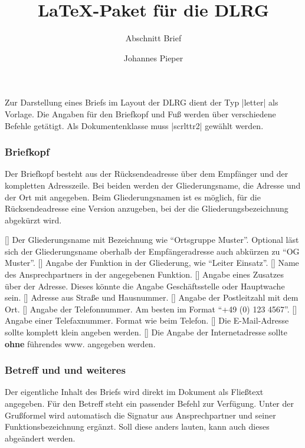 \documentclass[
    a4paper,
    12pt,
    parskip=half,
]{scrartcl}
\title{\LaTeX{}-Paket für die DLRG}
\subtitle{Abschnitt Brief}
\author{Johannes Pieper}
\begin{document}
    Zur Darstellung eines Briefs im Layout der DLRG dient der Typ \verbcode|letter| als Vorlage. Die Angaben für den Briefkopf und Fuß werden über verschiedene Befehle getätigt. Als Dokumentenklasse muss \verbcode|scrlttr2| gewählt werden.

    \subsubsection{Briefkopf}
        Der Briefkopf besteht aus der Rücksendeadresse über dem Empfänger und der kompletten Adresszeile. Bei beiden werden der Gliederungsname, die Adresse und der Ort mit angegeben. Beim Gliederungsnamen ist es möglich, für die Rücksendeadresse eine Version anzugeben, bei der die Gliederungsbezeichnung abgekürzt wird.

        \begin{commands}
            [] Der Gliederungsname mit Bezeichnung wie "`Ortsgruppe Muster"'. Optional läst sich der Gliederungsname oberhalb der Empfängeradresse auch abkürzen zu "`OG Muster"'.
            [] Angabe der Funktion in der Gliederung, wie "`Leiter Einsatz"'.
            [] Name des Ansprechpartners in der angegebenen Funktion.
            [] Angabe eines Zusatzes über der Adresse. Dieses könnte die Angabe Geschäftsstelle oder Hauptwache sein.
            [] Adresse aus Straße und Hausnummer.
            [] Angabe der Postleitzahl mit dem Ort.
            [] Angabe der Telefonnummer. Am besten im Format "`+49 (0) 123 4567"'.
            [] Angabe einer Telefaxnummer. Format wie beim Telefon.
            [] Die E-Mail-Adresse sollte komplett klein angeben werden.
            [] Die Angabe der Internetadresse sollte \textbf{ohne} führendes www. angegeben werden.
        \end{commands}

    \subsubsection{Betreff und und weiteres}
        Der eigentliche Inhalt des Briefs wird direkt im Dokument als Fließtext angegeben. Für den Betreff steht ein passender Befehl zur Verfügung. Unter der Grußformel wird automatisch die Signatur aus Ansprechpartner und seiner Funktionsbezeichnung ergänzt. Soll diese anders lauten, kann auch dieses abgeändert werden.
\end{document}
